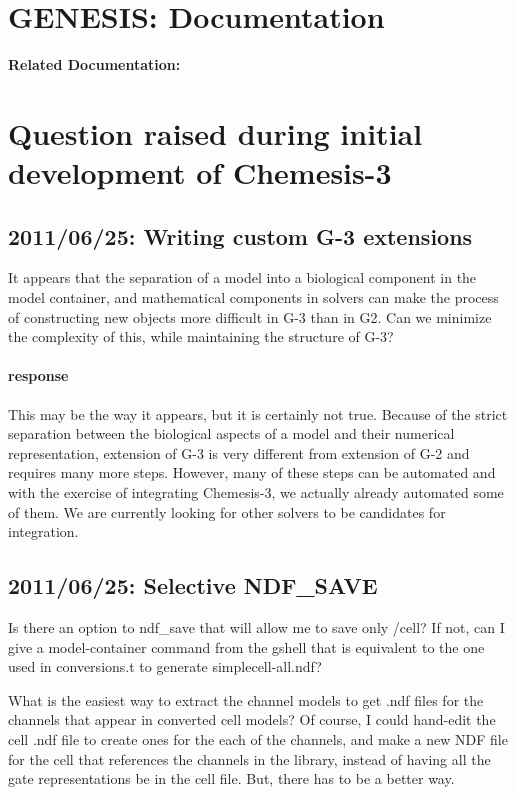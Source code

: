 \documentclass[12pt]{article}
\begin{document}

\section*{GENESIS: Documentation}

{\bf Related Documentation:}

\section*{Question raised during initial development of Chemesis-3}

\subsection{2011/06/25: Writing custom G-3 extensions}

It appears that the separation of a model into a biological component
in the model container, and mathematical components in solvers can
make the process of constructing new objects more difficult in G-3
than in G2. Can we minimize the complexity of this, while maintaining
the structure of G-3?

\paragraph{response} This may be the way it appears, but it is
certainly not true.  Because of the strict separation between the
biological aspects of a model and their numerical representation,
extension of G-3 is very different from extension of G-2 and requires
many more steps.  However, many of these steps can be automated and
with the exercise of integrating Chemesis-3, we actually already
automated some of them.  We are currently looking for other solvers to
be candidates for integration.


\subsection{2011/06/25: Selective NDF\_SAVE}

Is there an option to ndf\_save that will allow me to save only /cell?
If not, can I give a model-container command from the gshell that is
equivalent to the one used in conversions.t to generate
simplecell-all.ndf?

What is the easiest way to extract the channel models to get .ndf
files for the channels that appear in converted cell models?  Of
course, I could hand-edit the cell .ndf file to create ones for the
each of the channels, and make a new NDF file for the cell that
references the channels in the library, instead of having all the gate
representations be in the cell file.  But, there has to be a better
way.
\end{document}

